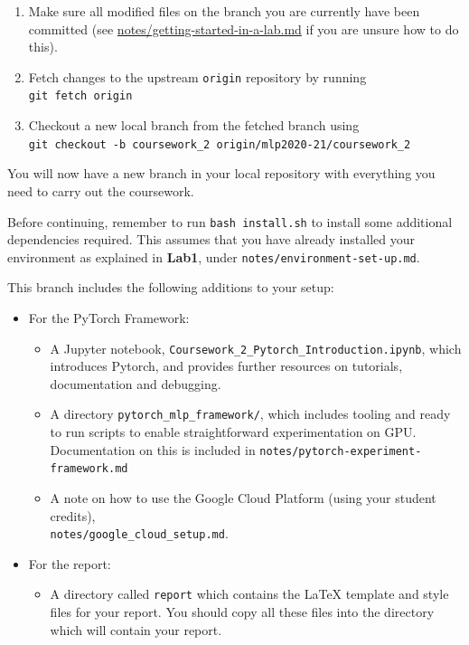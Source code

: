 \documentclass[11pt,]{article}
\begin{document}
\begin{enumerate}
\item
  Make sure all modified files on the branch you are currently have been
  committed
  (see \href{https://github.com/VICO-UoE/mlpractical/blob/mlp2020-21/lab7/notes/getting-started-in-a-lab.md}{notes/getting-started-in-a-lab.md} if you are unsure how to do this).
\item
  Fetch changes to the upstream \texttt{origin} repository by running\\
  \texttt{git fetch origin}
\item
  Checkout a new local branch from the fetched branch using\\
  \verb+git checkout -b coursework_2 origin/mlp2020-21/coursework_2+
\end{enumerate}

You will now have a new branch in your local repository with everything you need to carry out the coursework.

Before continuing, remember to run \texttt{bash install.sh} to install some additional dependencies required. This assumes that you have already installed your environment as explained in \textbf{Lab1}, under \texttt{notes/environment-set-up.md}.

This branch includes the following additions to your setup:

\begin{itemize}
    \item For the PyTorch Framework: 
    \begin{itemize}
        \item A Jupyter notebook, \texttt{Coursework\_2\_Pytorch\_Introduction.ipynb}, which introduces Pytorch, and provides further resources on tutorials, documentation and debugging.
        \item A directory \texttt{pytorch\_mlp\_framework/}, which includes tooling and ready to run scripts to enable straightforward experimentation on GPU.  Documentation on this is included in  \texttt{notes/pytorch-experiment-framework.md}
        \item A note on how to use the Google Cloud Platform (using your student credits),\\\texttt{notes/google\_cloud\_setup.md}.
    \end{itemize}
     \item For the report:
    \begin{itemize}
        \item  A directory called  \texttt{report} which contains the LaTeX template and style files for your report.  You should copy all these files into the directory which will contain your report.
    \end{itemize}
\end{itemize}
\end{document}
